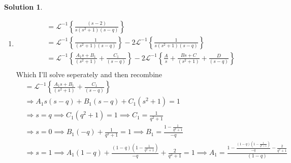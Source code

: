 \documentclass[10pt]{article}
\theoremstyle{definition}
\newtheorem{soln}{Solution}
\newcommand{\laplace}{\mathcal{L}}
\begin{document}
\begin{soln}~
  \begin{enumerate}[label=(\alph*)]
    \item \begin{align*}
             & =\laplace^{-1}\left\{\frac{\left(s-2\right)}{s\left(s^2+1\right)\left(s-q\right)}\right\}                                                                                                         \\
             & =\laplace^{-1}\left\{\frac{1}{\left(s^2+1\right)\left(s-q\right)}\right\}-2\laplace^{-1}\left\{\frac{1}{s\left(s^2+1\right)\left(s-q\right)}\right\}                                              \\
             & =\laplace^{-1}\left\{\frac{A_1s+B_1}{\left(s^2+1\right)}+\frac{C_1}{\left(s-q\right)}\right\}-2\laplace^{-1}\left\{\frac{A}{s}+\frac{Bs+C}{\left(s^2+1\right)}+\frac{D}{\left(s-q\right)}\right\} \\
          \end{align*}
          Which I'll solve seperately and then recombine
          \begin{align*}
             & =\laplace^{-1}\left\{\frac{A_1s+B_1}{\left(s^2+1\right)}+\frac{C_1}{\left(s-q\right)}\right\}                                                                                                                                            \\
             & \Rightarrow A_1s\left(s-q\right)+B_1\left(s-q\right)+C_1\left(s^2+1\right)=1                                                                                                                                                             \\
             & \Rightarrow s=q \implies C_1\left(q^2+1\right)=1 \implies C_1=\frac{1}{q^2+1}                                                                                                                                                            \\
             & \Rightarrow s=0 \implies B_1\left(-q\right)+\frac{1}{q^2+1}=1 \implies B_1=\frac{1-\frac{1}{q^2+1}}{-q}                                                                                                                                  \\
             & \Rightarrow s=1\implies A_1\left(1-q\right)+\frac{\left(1-q\right)\left(1-\frac{1}{q^2+1}\right)}{-q}+\frac{2}{q^2+1}=1\implies A_1=\frac{1-\frac{\left(1-q\right)\left(1-\frac{1}{q^2+1}\right)}{-q}-\frac{2}{q^2+1}}{\left(1-q\right)} \\

\end{align*}
\end{enumerate}
\end{soln}
\end{document}
